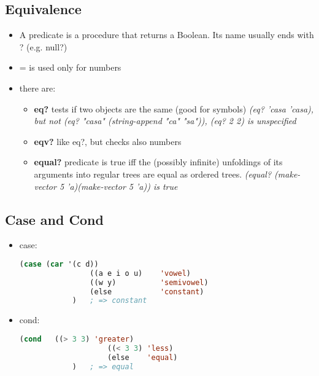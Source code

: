 \subsection{Equivalence}
\begin{itemize}
    \item A predicate is a procedure that returns a Boolean. Its name usually ends with ? (e.g. null?)
    \item = is used only for numbers
    \item there are:
    \begin{itemize}
        \item \textbf{eq?} tests if two objects are the same (good for symbols) \textit{(eq? ’casa ’casa), but not (eq? "casa" (string-append "ca" "sa")), (eq? 2 2) is unspecified}
        \item \textbf{eqv?} like eq?, but checks also numbers
        \item \textbf{equal?} predicate is true iff the (possibly infinite) unfoldings of its arguments into regular trees are equal as ordered trees. \textit{(equal? (make-vector 5 'a)(make-vector 5 'a)) is true}
    \end{itemize}
\end{itemize}

\subsection{Case and Cond}
\begin{itemize}
    \item case:
        \begin{lstlisting}[language=Lisp]
            (case (car '(c d))
                ((a e i o u)    'vowel)
                ((w y)          'semivowel)
                (else           'constant) 
            )   ; => constant
        \end{lstlisting}
    \item cond:
        \begin{lstlisting}[language=Lisp]
            (cond   ((> 3 3) 'greater)
                    ((< 3 3) 'less)
                    (else    'equal)
            )   ; => equal
        \end{lstlisting}
\end{itemize}

